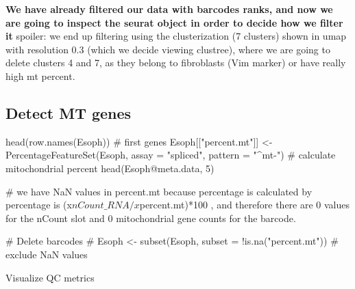 \documentclass[
  letterpaper,
  DIV=11,
  numbers=noendperiod]{scrreprt}
\newenvironment{Shaded}{\begin{snugshade}}{\end{snugshade}}
\newcommand{\AttributeTok}[1]{\textcolor[rgb]{0.40,0.45,0.13}{#1}}
\newcommand{\CommentTok}[1]{\textcolor[rgb]{0.37,0.37,0.37}{#1}}
\newcommand{\DecValTok}[1]{\textcolor[rgb]{0.68,0.00,0.00}{#1}}
\newcommand{\FunctionTok}[1]{\textcolor[rgb]{0.28,0.35,0.67}{#1}}
\newcommand{\NormalTok}[1]{\textcolor[rgb]{0.00,0.23,0.31}{#1}}
\newcommand{\OtherTok}[1]{\textcolor[rgb]{0.00,0.23,0.31}{#1}}
\newcommand{\SpecialCharTok}[1]{\textcolor[rgb]{0.37,0.37,0.37}{#1}}
\newcommand{\StringTok}[1]{\textcolor[rgb]{0.13,0.47,0.30}{#1}}
\begin{document}
\textbf{We have already filtered our data with barcodes ranks, and now
we are going to inspect the seurat object in order to decide how we
filter it} spoiler: we end up filtering using the clusterization (7
clusters) shown in umap with resolution 0.3 (which we decide viewing
clustree), where we are going to delete clusters 4 and 7, as they belong
to fibroblasts (Vim marker) or have really high mt percent.

\subsection{Detect MT genes}\label{detect-mt-genes}

\begin{Shaded}
\begin{Highlighting}[]
\FunctionTok{head}\NormalTok{(}\FunctionTok{row.names}\NormalTok{(Esoph)) }\CommentTok{\# first genes}
\NormalTok{Esoph[[}\StringTok{"percent.mt"}\NormalTok{]] }\OtherTok{\textless{}{-}} \FunctionTok{PercentageFeatureSet}\NormalTok{(Esoph, }\AttributeTok{assay =} \StringTok{"spliced"}\NormalTok{, }\AttributeTok{pattern =} \StringTok{"\^{}mt{-}"}\NormalTok{) }\CommentTok{\# calculate mitochondrial percent}
\FunctionTok{head}\NormalTok{(Esoph}\SpecialCharTok{@}\NormalTok{meta.data, }\DecValTok{5}\NormalTok{)}

\CommentTok{\# we have NaN values in percent.mt because percentage is calculated by percentage is (x$nCount\_RNA/x$percent.mt)*100  , and therefore there are 0 values for the nCount slot and 0 mitochondrial gene counts for the barcode. }

\CommentTok{\# Delete barcodes}
\CommentTok{\# Esoph \textless{}{-} subset(Esoph, subset = !is.na("percent.mt")) \# exclude NaN values}
\end{Highlighting}
\end{Shaded}

Visualize QC metrics
\end{document}
